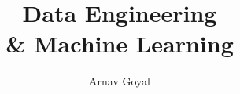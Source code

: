 \lstset{language=C}

\title{Data Engineering \\ \& Machine Learning}
\author{Arnav Goyal}

\def\myreferences{
	\item Provided Course Material \& Lecture Notes
}


	\frontmatter
	\maketitle
	\preface
	
	\mainmatter

